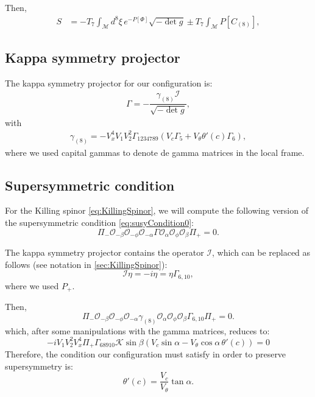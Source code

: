 Then,
\begin{align}
 S & = -T_7 \int_\mathcal{M} d^8\xi \, e^{-P[\Phi] } \sqrt{-\det g} \pm
 T_7\int _\mathcal{M} P[C_{(8)}],
\end{align}

\subsection{Kappa symmetry projector}

The kappa symmetry projector for our configuration is:
\begin{align}
\Gamma = - \dfrac{ \gamma_{(8)} \mathcal{I} }{\sqrt{-\det g}},
\end{align}
with
\begin{align}
 \gamma_{(8)} = - V_x^4 V_1 V_2^2 \Gamma_{1 2 3 4 7 8 9}( V_c \Gamma_5 +  V_{\theta} \theta'(c) \Gamma_6), 
\end{align}
where we used capital gammas to denote de gamma matrices in the local frame. 


\subsection{Supersymmetric condition}
For the Killing spinor \eqref{eq:KillingSpinor}, we will compute the following version of the supersymmetric condition \eqref{eq:susyCondition0}:
\begin{equation}
 \Pi_{-} \mathcal{O}_{-\beta} \mathcal{O}_{-\phi}\mathcal{O}_{-\alpha} \Gamma \mathcal{O}_{\alpha} \mathcal{O}_{\phi} \mathcal{O}_{\beta} \Pi_{+}  = 0.
\end{equation}

The kappa symmetry projector contains the operator $\mathcal{I}$, which can be replaced as follows (see notation in \ref{sec:KillingSpinor}):
\begin{equation}
 \mathcal{I}\eta =-i \eta =\eta  \Gamma_{6,10},
\end{equation}
where we used $P_+$. 

Then,
\begin{equation}
 \Pi_{-} \mathcal{O}_{-\beta} \mathcal{O}_{-\phi}\mathcal{O}_{-\alpha} \gamma_{(8)} \mathcal{O}_{\alpha} \mathcal{O}_{\phi} \mathcal{O}_{\beta} \Gamma_{6,10} \Pi_{+}  = 0.
\end{equation}
which, after some manipulations with the gamma matrices, reduces to:
\begin{equation}
-i V_1 V_2^2 V_x^4 \Pi_+ \Gamma_{6 8 9 10} \mathcal{K} \sin\beta \left(V_c \sin\alpha - V_\theta \cos\alpha \, \theta'(c)\right) = 0
\end{equation}
Therefore, the condition our configuration must satisfy in order to preserve supersymmetry is:
\begin{equation}
 \boxed{\theta'(c) = \dfrac{V_c}{V_\theta} \tan\alpha}.
\end{equation}

